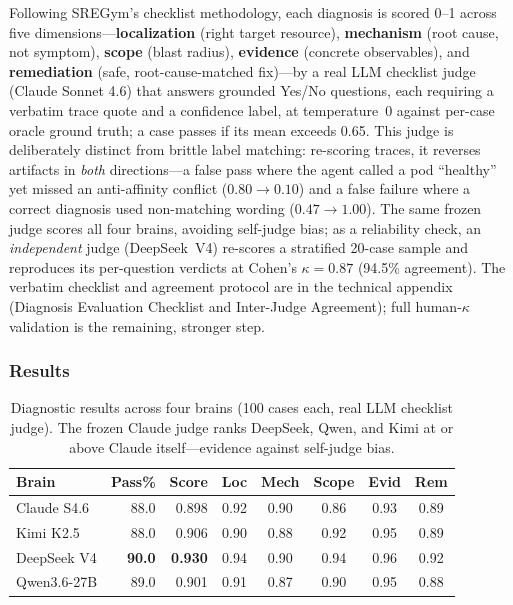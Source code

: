 \documentclass[letterpaper]{article}
\begin{document}
Following SREGym's checklist methodology, each diagnosis is scored 0--1 across five dimensions---\textbf{localization} (right target resource), \textbf{mechanism} (root cause, not symptom), \textbf{scope} (blast radius), \textbf{evidence} (concrete observables), and \textbf{remediation} (safe, root-cause-matched fix)---by a real LLM checklist judge (Claude Sonnet 4.6) that answers grounded Yes/No questions, each requiring a verbatim trace quote and a confidence label, at temperature~0 against per-case oracle ground truth; a case passes if its mean exceeds 0.65.
This judge is deliberately distinct from brittle label matching: re-scoring traces, it reverses artifacts in \emph{both} directions---a false pass where the agent called a pod ``healthy'' yet missed an anti-affinity conflict ($0.80\!\rightarrow\!0.10$) and a false failure where a correct diagnosis used non-matching wording ($0.47\!\rightarrow\!1.00$).
The same frozen judge scores all four brains, avoiding self-judge bias; as a reliability check, an \emph{independent} judge (DeepSeek~V4) re-scores a stratified 20-case sample and reproduces its per-question verdicts at Cohen's $\kappa = 0.87$ (94.5\% agreement). The verbatim checklist and agreement protocol are in the technical appendix (Diagnosis Evaluation Checklist and Inter-Judge Agreement); full human-$\kappa$ validation is the remaining, stronger step.

\subsubsection{Results}

\begin{table}[t]
\centering
\caption{Diagnostic results across four brains (100 cases each, real LLM checklist judge). The frozen Claude judge ranks DeepSeek, Qwen, and Kimi at or above Claude itself---evidence against self-judge bias.}
\label{tab:models}
\small
\setlength{\tabcolsep}{2.6pt}
\begin{tabular}{@{}lrrccccc@{}}
\toprule
\textbf{Brain} & \textbf{Pass\%} & \textbf{Score} & \textbf{Loc} & \textbf{Mech} & \textbf{Scope} & \textbf{Evid} & \textbf{Rem} \\
\midrule
Claude S4.6     & 88.0 & 0.898 & 0.92 & 0.90 & 0.86 & 0.93 & 0.89 \\
Kimi K2.5       & 88.0 & 0.906 & 0.90 & 0.88 & 0.92 & 0.95 & 0.89 \\
DeepSeek V4     & \textbf{90.0} & \textbf{0.930} & 0.94 & 0.90 & 0.94 & 0.96 & 0.92 \\
Qwen3.6-27B     & 89.0 & 0.901 & 0.91 & 0.87 & 0.90 & 0.95 & 0.88 \\
\bottomrule
\end{tabular}
\end{table}
\end{document}
